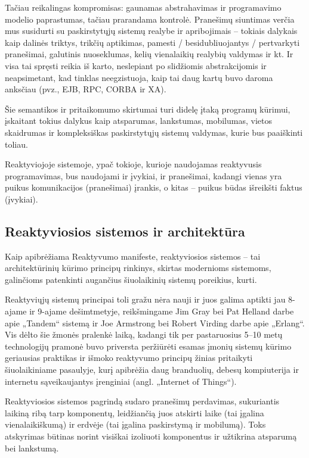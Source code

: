 Tačiau reikalingas kompromisas: gaunamas abstrahavimas ir programavimo modelio paprastumas, tačiau prarandama kontrolė. Pranešimų siuntimas verčia mus susidurti su paskirstytųjų sistemų realybe ir apribojimais – tokiais dalykais kaip dalinės triktys, trikčių aptikimas, pamesti / besidubliuojantys / pertvarkyti pranešimai, galutinis nuoseklumas, kelių vienalaikių realybių valdymas ir kt. Ir visa tai spręsti reikia iš karto, neslepiant po slidžiomis abstrakcijomis ir neapsimetant, kad tinklas neegzistuoja, kaip tai daug kartų buvo daroma anksčiau (pvz., EJB, RPC, CORBA ir XA).

Šie semantikos ir pritaikomumo skirtumai turi didelę įtaką programų kūrimui, įskaitant tokius dalykus kaip atsparumas, lankstumas, mobilumas, vietos skaidrumas ir kompleksiškas paskirstytųjų sistemų valdymas, kurie bus paaiškinti toliau.

Reaktyviojoje sistemoje, ypač tokioje, kurioje naudojamas reaktyvusis programavimas, bus naudojami ir įvykiai, ir pranešimai, kadangi vienas yra puikus komunikacijos (pranešimai) įrankis, o kitas – puikus būdas išreikšti faktus (įvykiai).

\subsection{Reaktyviosios sistemos ir architektūra}

Kaip apibrėžiama Reaktyvumo manifeste, reaktyviosios sistemos – tai architektūrinių kūrimo principų rinkinys, skirtas modernioms sistemoms, galinčioms patenkinti augančius šiuolaikinių sistemų poreikius, kurti.

Reaktyviųjų sistemų principai toli gražu nėra nauji ir juos galima aptikti jau 8-ajame ir 9-ajame dešimtmetyje, reikšmingame Jim Gray bei Pat Helland darbe apie „Tandem“ sistemą ir Joe Armstrong bei Robert Virding darbe apie „Erlang“. Vis dėlto šie žmonės pralenkė laiką, kadangi tik per pastaruosius 5–10 metų technologijų pramonė buvo priversta peržiūrėti esamas įmonių sistemų kūrimo geriausias praktikas ir išmoko reaktyvumo principų žinias pritaikyti šiuolaikiniame pasaulyje, kurį apibrėžia daug branduolių, debesų kompiuterija ir internetu sąveikaujantys įrenginiai (angl. „Internet of Things“).

Reaktyviosios sistemos pagrindą sudaro pranešimų perdavimas, sukuriantis laikiną ribą tarp komponentų, leidžiančią juos atskirti laike (tai įgalina vienalaikiškumą) ir erdvėje (tai įgalina paskirstymą ir mobilumą). Toks atskyrimas būtinas norint visiškai izoliuoti komponentus ir užtikrina atsparumą bei lankstumą.

